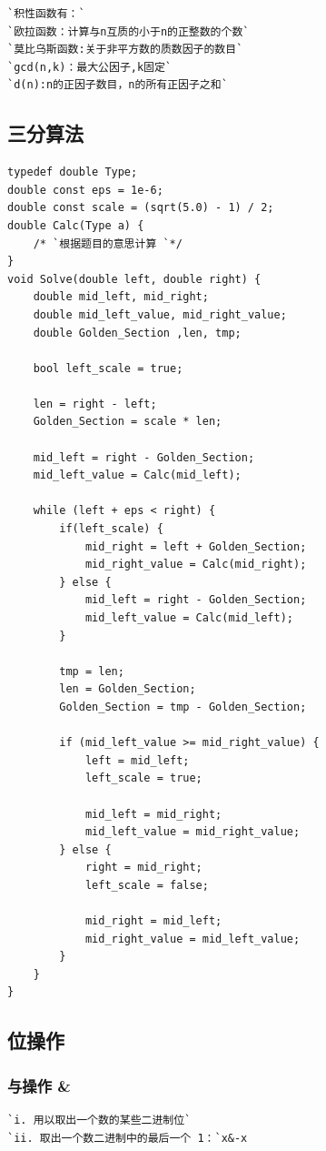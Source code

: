 \documentclass[a4paper]{article}
\begin{document}
\begin{CJK*}{UTF8}{gbsn}
\begin{multicols}{3}
\begin{flushleft}
\begin{lstlisting}
`积性函数有：`
`欧拉函数：计算与n互质的小于n的正整数的个数`
`莫比乌斯函数:关于非平方数的质数因子的数目`
`gcd(n,k)：最大公因子,k固定`
`d(n):n的正因子数目，n的所有正因子之和`
\end{lstlisting}

\subsection{三分算法}
\begin{lstlisting}
typedef double Type;
double const eps = 1e-6;
double const scale = (sqrt(5.0) - 1) / 2;
double Calc(Type a) {
    /* `根据题目的意思计算 `*/
}
void Solve(double left, double right) {
    double mid_left, mid_right;
    double mid_left_value, mid_right_value;
    double Golden_Section ,len, tmp;

    bool left_scale = true;

    len = right - left;
    Golden_Section = scale * len;

    mid_left = right - Golden_Section;
    mid_left_value = Calc(mid_left);

    while (left + eps < right) {
        if(left_scale) {
            mid_right = left + Golden_Section;
            mid_right_value = Calc(mid_right);
        } else {
            mid_left = right - Golden_Section;
            mid_left_value = Calc(mid_left);
        }

        tmp = len;
        len = Golden_Section;
        Golden_Section = tmp - Golden_Section;

        if (mid_left_value >= mid_right_value) {
            left = mid_left;
            left_scale = true;

            mid_left = mid_right;
            mid_left_value = mid_right_value;
        } else {
            right = mid_right;
            left_scale = false;

            mid_right = mid_left;
            mid_right_value = mid_left_value;
        }
    }
}
\end{lstlisting}

\subsection{位操作}

\subsubsection{与操作 \&}
\begin{lstlisting}
`i. 用以取出一个数的某些二进制位`
`ii. 取出一个数二进制中的最后一个 1：`x&-x
\end{lstlisting}


\end{flushleft}
\end{multicols}
\end{CJK*}
\end{document}
